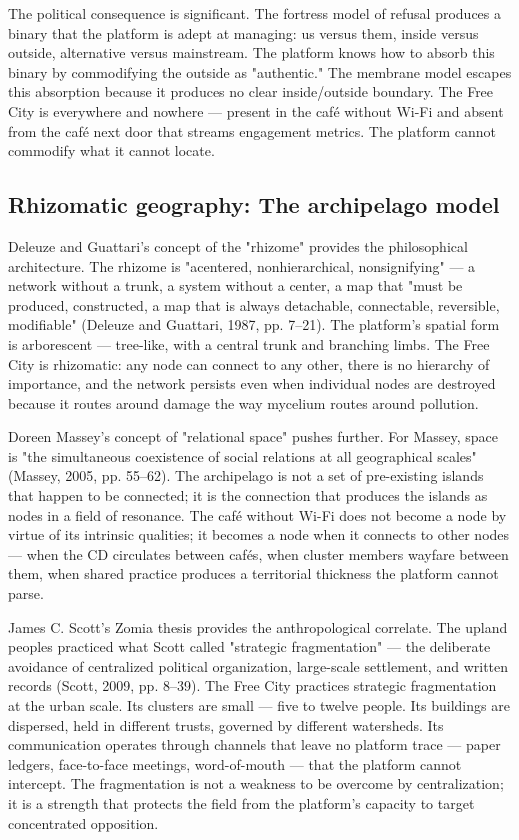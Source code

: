 The political consequence is significant. The fortress model of refusal produces a binary that the platform is adept at managing: us versus them, inside versus outside, alternative versus mainstream. The platform knows how to absorb this binary by commodifying the outside as "authentic." The membrane model escapes this absorption because it produces no clear inside/outside boundary. The Free City is everywhere and nowhere — present in the café without Wi-Fi and absent from the café next door that streams engagement metrics. The platform cannot commodify what it cannot locate.

\subsection{Rhizomatic geography: The archipelago model}

Deleuze and Guattari's concept of the "rhizome" provides the philosophical architecture. The rhizome is "acentered, nonhierarchical, nonsignifying" — a network without a trunk, a system without a center, a map that "must be produced, constructed, a map that is always detachable, connectable, reversible, modifiable" (Deleuze and Guattari, 1987, pp. 7–21). The platform's spatial form is arborescent — tree-like, with a central trunk and branching limbs. The Free City is rhizomatic: any node can connect to any other, there is no hierarchy of importance, and the network persists even when individual nodes are destroyed because it routes around damage the way mycelium routes around pollution.

Doreen Massey's concept of "relational space" pushes further. For Massey, space is "the simultaneous coexistence of social relations at all geographical scales" (Massey, 2005, pp. 55–62). The archipelago is not a set of pre-existing islands that happen to be connected; it is the connection that produces the islands as nodes in a field of resonance. The café without Wi-Fi does not become a node by virtue of its intrinsic qualities; it becomes a node when it connects to other nodes — when the CD circulates between cafés, when cluster members wayfare between them, when shared practice produces a territorial thickness the platform cannot parse.

James C. Scott's Zomia thesis provides the anthropological correlate. The upland peoples practiced what Scott called "strategic fragmentation" — the deliberate avoidance of centralized political organization, large-scale settlement, and written records (Scott, 2009, pp. 8–39). The Free City practices strategic fragmentation at the urban scale. Its clusters are small — five to twelve people. Its buildings are dispersed, held in different trusts, governed by different watersheds. Its communication operates through channels that leave no platform trace — paper ledgers, face-to-face meetings, word-of-mouth — that the platform cannot intercept. The fragmentation is not a weakness to be overcome by centralization; it is a strength that protects the field from the platform's capacity to target concentrated opposition.

